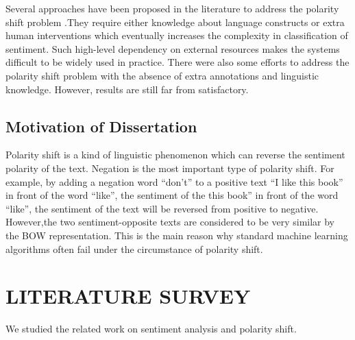 \documentclass[oneside,a4paper,12pt]{pictreport}
\begin{document}
\par Several approaches have been proposed in the literature
to address the polarity shift problem .They require either knowledge about language constructs or
extra human interventions which eventually increases the complexity in classification of sentiment.  Such
high-level dependency on external resources makes the systems 
difficult to be widely used in practice. There were also
some efforts to address the polarity shift problem with the
absence of extra annotations and linguistic knowledge. However, results are still far from satisfactory.
\section{Motivation of Dissertation}
Polarity shift is a kind of linguistic phenomenon which can reverse the sentiment polarity of the text. Negation is
the most important type of polarity shift. For example, by adding a negation word “don’t” to a positive text “I like
this book” in front of the word “like”, the sentiment of the this book” in front of the word “like”, the sentiment of the
text will be reversed from positive to negative. However,the two sentiment-opposite texts are considered to be
very similar by the BOW representation. This is the main reason why standard machine learning algorithms often
fail under the circumstance of polarity shift.


\chapter{LITERATURE SURVEY}

We studied the related work on sentiment analysis and
polarity shift.
\end{document}
